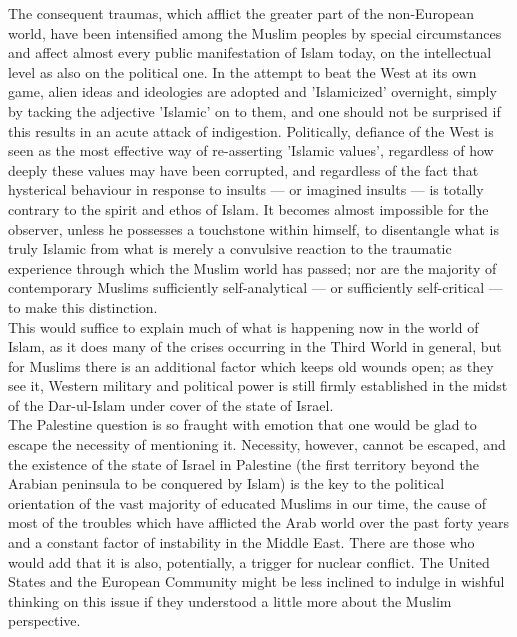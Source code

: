 \documentclass[10pt, twoside]{book}
\begin{document}
The consequent traumas, which afflict the greater part of the non\hyp{}European world, have been intensified among the Muslim peoples by special circumstances and affect almost every public manifestation of Islam today, on the intellectual level as also on the political one. In the attempt to beat the West at its own game, alien ideas and ideologies are adopted and 'Islamicized' overnight, simply by tacking the adjective 'Islamic' on to them, and one should not be surprised if this results in an acute attack of indigestion. Politically, defiance of the West is seen as the most effective way of re-asserting 'Islamic values', regardless of how deeply these values may have been corrupted, and regardless of the fact that hysterical behaviour in response to insults --- or imagined insults --- is totally contrary to the spirit and ethos of Islam. It becomes almost impossible for the observer, unless he possesses a touchstone within himself, to disentangle what is truly Islamic from what is merely a convulsive reaction to the traumatic experience through which the Muslim world has passed; nor are the majority of contemporary Muslims sufficiently self\hyp{}analytical --- or sufficiently self\hyp{}critical --- to make this distinction. \\

This would suffice to explain much of what is happening now in the world of Islam, as it does many of the crises occurring in the Third World in general, but for Muslims there is an additional factor which keeps old wounds open; as they see it, Western military and political power is still firmly established in the midst of the Dar\hyp{}ul\hyp{}Islam under cover of the state of Israel. \\

The Palestine question is so fraught with emotion that one would be glad to escape the necessity of mentioning it. Necessity, however, cannot be escaped, and the existence of the state of Israel in Palestine (the first territory beyond the Arabian peninsula to be conquered by Islam) is the key to the political orientation of the vast majority of educated Muslims in our time, the cause of most of the troubles which have afflicted the Arab world over the past forty years and a constant factor of instability in the Middle East. There are those who would add that it is also, potentially, a trigger for nuclear conflict. The United States and the European Community might be less inclined to indulge in wishful thinking on this issue if they understood a little more about the Muslim perspective. \\
\end{document}
